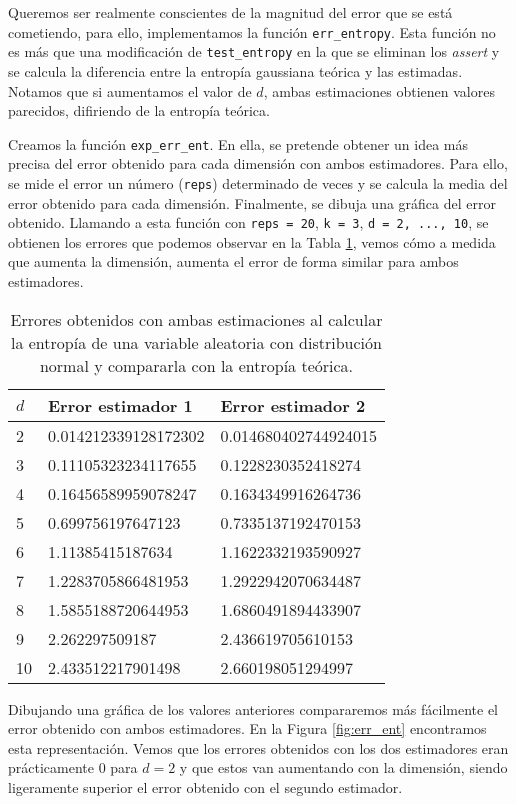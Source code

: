 \documentclass[12pt,a4paper]{report} %
\theoremstyle{definition}
\begin{document}
Queremos ser realmente conscientes de la magnitud del error que se está cometiendo, para ello, implementamos la función \texttt{err\_entropy}. Esta función no es más que una modificación de \texttt{test\_entropy} en la que se eliminan los \textit{assert} y se calcula la diferencia entre la entropía gaussiana teórica y las estimadas. Notamos que si aumentamos el valor de $d$, ambas estimaciones obtienen valores parecidos, difiriendo de la entropía teórica.

Creamos la función \texttt{exp\_err\_ent}. En ella, se pretende obtener un idea más precisa del error obtenido para cada dimensión con ambos estimadores. Para ello, se mide el error un número (\texttt{reps}) determinado de veces y se calcula la media del error obtenido para cada dimensión. Finalmente, se dibuja una gráfica del error obtenido. Llamando a esta función con \texttt{reps = 20}, \texttt{k = 3}, \texttt{d = 2, ..., 10}, se obtienen los errores que podemos observar en la Tabla \ref{tab:err_ent}, vemos cómo a medida que aumenta la dimensión, aumenta el error de forma similar para ambos estimadores.

\begin{table}[H]
\centering
\caption{Errores obtenidos con ambas estimaciones al calcular la entropía de una variable aleatoria con distribución normal y compararla con la entropía teórica.}
\label{tab:err_ent}
\begin{tabular}{lll}
\toprule
$d$ & Error estimador 1 & Error estimador 2\\ \midrule
2 & 0.014212339128172302 & 0.014680402744924015\\
3 & 0.11105323234117655 & 0.1228230352418274\\
4 & 0.16456589959078247 & 0.1634349916264736\\
5 & 0.699756197647123 & 0.7335137192470153\\
6 & 1.11385415187634 & 1.1622332193590927\\
7 & 1.2283705866481953 & 1.2922942070634487\\
8 & 1.5855188720644953 & 1.6860491894433907\\
9 & 2.262297509187 & 2.436619705610153\\
10 & 2.433512217901498 & 2.660198051294997\\
\bottomrule
\end{tabular}
\end{table}

Dibujando una gráfica de los valores anteriores compararemos más fácilmente el error obtenido con ambos estimadores. En la Figura \ref{fig:err_ent} encontramos esta representación. Vemos que los errores obtenidos con los dos estimadores eran prácticamente 0 para $d=2$ y que estos van aumentando con la dimensión, siendo ligeramente superior el error obtenido con el segundo estimador. 
\end{document}
